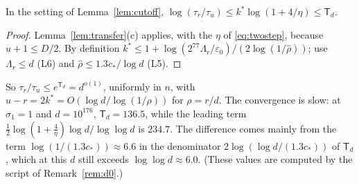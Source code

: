 \begin{lemma}\label{lem:band}
In the setting of Lemma~\ref{lem:cutoff},
$\log(\tau_r/\tau_u)\le k^*\log(1+4/\eta)\le\mathsf T_d$.
\end{lemma}
\begin{proof}
Lemma~\ref{lem:transfer}(c) applies, with the $\eta$ of
\eqref{eq:twostep}, because $u+1\le D/2$. By definition
$k^*\le1+\log(2^{77}\Lambda_r/\varepsilon_0)/(2\log(1/\hat\rho))$; use
$\Lambda_r\le d$ (L6) and $\hat\rho\le1.3c_*/\log d$ (L5).
\end{proof}

So $\tau_r/\tau_u\le e^{\mathsf T_d}=d^{o(1)}$, uniformly in $n$, with
$u-r=2k^*=O(\log d/\log(1/\rho))$ for $\rho=r/d$. The convergence is slow:
at $\sigma_1=1$ and $d=10^{176}$, $\mathsf T_d=136.5$, while the leading
term $\frac12\log(1+\frac4\eta)\log d/\log\log d$ is $234.7$. The
difference comes mainly from the term $\log(1/(1.3c_*))\approx6.6$ in the
denominator $2\log(\log d/(1.3c_*))$ of $\mathsf T_d$, which at this $d$
still exceeds $\log\log d\approx6.0$. (These values are computed by the
script of Remark~\ref{rem:d0}.)

